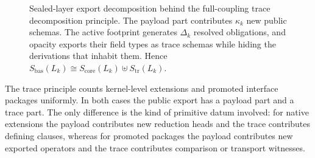 \documentclass{lmcs}
\newcommand{\Foot}{\mathrm{Foot}}
\begin{document}
\begin{figure}[t]
\centering
{}
\caption{Sealed-layer export decomposition behind the full-coupling trace decomposition principle. The payload part contributes $\kappa_k$ new public schemas. The active footprint generates $\Delta_k$ resolved obligations, and opacity exports their field types as trace schemas while hiding the derivations that inhabit them. Hence $S_{\mathrm{bas}}(L_k)\cong S_{\mathrm{core}}(L_k)\uplus S_{\mathrm{tr}}(L_k)$.}
\label{fig:trace-principle}
\end{figure}

\begin{rem}
\label{rem:trace-native-vs-api}
The trace principle counts kernel-level extensions and promoted interface packages uniformly. In both cases the public export has a payload part and a trace part. The only difference is the kind of primitive datum involved: for native extensions the payload contributes new reduction heads and the trace contributes defining clauses, whereas for promoted packages the payload contributes new exported operators and the trace contributes comparison or transport witnesses.
\end{rem}
\end{document}

